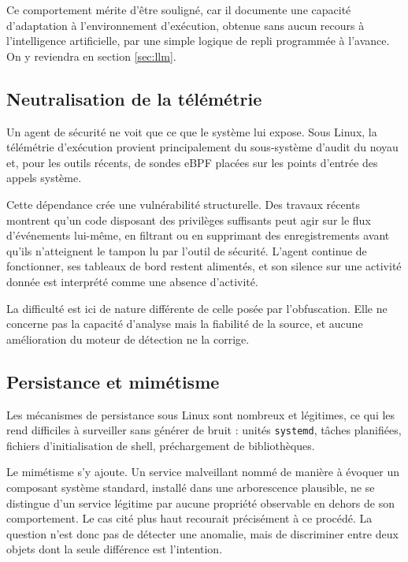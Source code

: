 Ce comportement mérite d'être souligné, car il documente une capacité d'adaptation à l'environnement d'exécution, obtenue sans aucun recours à l'intelligence artificielle, par une simple logique de repli programmée à l'avance. On y reviendra en section \ref{sec:llm}.

\subsection{Neutralisation de la télémétrie}

Un agent de sécurité ne voit que ce que le système lui expose. Sous Linux, la télémétrie d'exécution provient principalement du sous-système d'audit du noyau et, pour les outils récents, de sondes eBPF placées sur les points d'entrée des appels système.

Cette dépendance crée une vulnérabilité structurelle. Des travaux récents montrent qu'un code disposant des privilèges suffisants peut agir sur le flux d'événements lui-même, en filtrant ou en supprimant des enregistrements avant qu'ils n'atteignent le tampon lu par l'outil de sécurité. L'agent continue de fonctionner, ses tableaux de bord restent alimentés, et son silence sur une activité donnée est interprété comme une absence d'activité.

La difficulté est ici de nature différente de celle posée par l'obfuscation. Elle ne concerne pas la capacité d'analyse mais la fiabilité de la source, et aucune amélioration du moteur de détection ne la corrige.

\subsection{Persistance et mimétisme}

Les mécanismes de persistance sous Linux sont nombreux et légitimes, ce qui les rend difficiles à surveiller sans générer de bruit : unités \texttt{systemd}, tâches planifiées, fichiers d'initialisation de shell, préchargement de bibliothèques.

Le mimétisme s'y ajoute. Un service malveillant nommé de manière à évoquer un composant système standard, installé dans une arborescence plausible, ne se distingue d'un service légitime par aucune propriété observable en dehors de son comportement. Le cas cité plus haut recourait précisément à ce procédé. La question n'est donc pas de détecter une anomalie, mais de discriminer entre deux objets dont la seule différence est l'intention.

